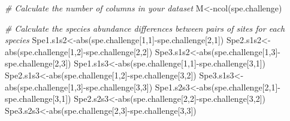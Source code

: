 \documentclass[
]{book}
\newenvironment{Shaded}{\begin{snugshade}}{\end{snugshade}}
\newcommand{\CommentTok}[1]{\textcolor[rgb]{0.56,0.35,0.01}{\textit{#1}}}
\newcommand{\DecValTok}[1]{\textcolor[rgb]{0.00,0.00,0.81}{#1}}
\newcommand{\FunctionTok}[1]{\textcolor[rgb]{0.00,0.00,0.00}{#1}}
\newcommand{\NormalTok}[1]{#1}
\newcommand{\OtherTok}[1]{\textcolor[rgb]{0.56,0.35,0.01}{#1}}
\newcommand{\SpecialCharTok}[1]{\textcolor[rgb]{0.00,0.00,0.00}{#1}}
\begin{document}
\begin{Shaded}
\begin{Highlighting}[]
\CommentTok{\# Calculate the number of columns in your dataset}
\NormalTok{M}\OtherTok{\textless{}{-}}\FunctionTok{ncol}\NormalTok{(spe.challenge)}

\CommentTok{\# Calculate the species abundance differences between pairs of sites for each species}
\NormalTok{Spe1.s1s2}\OtherTok{\textless{}{-}}\FunctionTok{abs}\NormalTok{(spe.challenge[}\DecValTok{1}\NormalTok{,}\DecValTok{1}\NormalTok{]}\SpecialCharTok{{-}}\NormalTok{spe.challenge[}\DecValTok{2}\NormalTok{,}\DecValTok{1}\NormalTok{])}
\NormalTok{Spe2.s1s2}\OtherTok{\textless{}{-}}\FunctionTok{abs}\NormalTok{(spe.challenge[}\DecValTok{1}\NormalTok{,}\DecValTok{2}\NormalTok{]}\SpecialCharTok{{-}}\NormalTok{spe.challenge[}\DecValTok{2}\NormalTok{,}\DecValTok{2}\NormalTok{])}
\NormalTok{Spe3.s1s2}\OtherTok{\textless{}{-}}\FunctionTok{abs}\NormalTok{(spe.challenge[}\DecValTok{1}\NormalTok{,}\DecValTok{3}\NormalTok{]}\SpecialCharTok{{-}}\NormalTok{spe.challenge[}\DecValTok{2}\NormalTok{,}\DecValTok{3}\NormalTok{])}
\NormalTok{Spe1.s1s3}\OtherTok{\textless{}{-}}\FunctionTok{abs}\NormalTok{(spe.challenge[}\DecValTok{1}\NormalTok{,}\DecValTok{1}\NormalTok{]}\SpecialCharTok{{-}}\NormalTok{spe.challenge[}\DecValTok{3}\NormalTok{,}\DecValTok{1}\NormalTok{])}
\NormalTok{Spe2.s1s3}\OtherTok{\textless{}{-}}\FunctionTok{abs}\NormalTok{(spe.challenge[}\DecValTok{1}\NormalTok{,}\DecValTok{2}\NormalTok{]}\SpecialCharTok{{-}}\NormalTok{spe.challenge[}\DecValTok{3}\NormalTok{,}\DecValTok{2}\NormalTok{])}
\NormalTok{Spe3.s1s3}\OtherTok{\textless{}{-}}\FunctionTok{abs}\NormalTok{(spe.challenge[}\DecValTok{1}\NormalTok{,}\DecValTok{3}\NormalTok{]}\SpecialCharTok{{-}}\NormalTok{spe.challenge[}\DecValTok{3}\NormalTok{,}\DecValTok{3}\NormalTok{])}
\NormalTok{Spe1.s2s3}\OtherTok{\textless{}{-}}\FunctionTok{abs}\NormalTok{(spe.challenge[}\DecValTok{2}\NormalTok{,}\DecValTok{1}\NormalTok{]}\SpecialCharTok{{-}}\NormalTok{spe.challenge[}\DecValTok{3}\NormalTok{,}\DecValTok{1}\NormalTok{])}
\NormalTok{Spe2.s2s3}\OtherTok{\textless{}{-}}\FunctionTok{abs}\NormalTok{(spe.challenge[}\DecValTok{2}\NormalTok{,}\DecValTok{2}\NormalTok{]}\SpecialCharTok{{-}}\NormalTok{spe.challenge[}\DecValTok{3}\NormalTok{,}\DecValTok{2}\NormalTok{])}
\NormalTok{Spe3.s2s3}\OtherTok{\textless{}{-}}\FunctionTok{abs}\NormalTok{(spe.challenge[}\DecValTok{2}\NormalTok{,}\DecValTok{3}\NormalTok{]}\SpecialCharTok{{-}}\NormalTok{spe.challenge[}\DecValTok{3}\NormalTok{,}\DecValTok{3}\NormalTok{])}


\end{Highlighting}
\end{Shaded}
\end{document}
